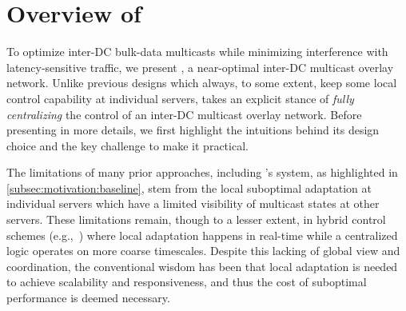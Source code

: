 \section{Overview of \name}
\label{sec:overview}

To optimize inter-DC bulk-data multicasts while minimizing
interference with latency-sensitive traffic, we present \name,
a near-optimal inter-DC multicast overlay network.
Unlike previous designs which always, to some extent, keep
some local control capability at individual servers,
\name takes an explicit stance of {\em fully centralizing} the
control of an inter-DC multicast overlay network.
Before presenting \name in more details,
we first highlight the intuitions behind its design
choice and the key challenge to make it practical.







The limitations of many prior approaches, including \company's
system, as highlighted in \Section\ref{subsec:motivation:baseline},
stem from the local suboptimal adaptation 
at individual servers which have 
a limited visibility of multicast states at
other servers.
These limitations remain, though to a lesser extent, in hybrid
control schemes (e.g.,~\cite{yin2009design}) where local
adaptation happens in real-time while a centralized logic
operates on more coarse timescales.
Despite this lacking of global view and coordination, the
conventional wisdom has
been that local adaptation is needed to achieve
scalability and responsiveness, and thus the cost of suboptimal
performance is deemed necessary.

